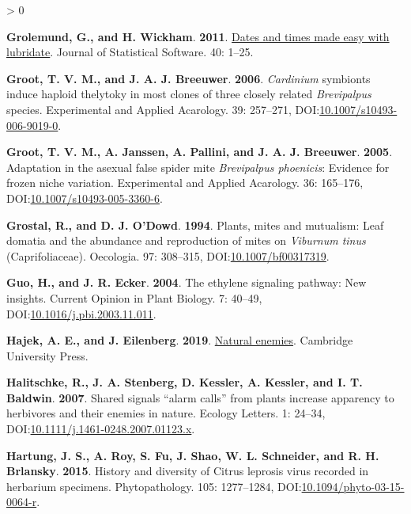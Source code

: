 \documentclass{ufdissertation}[overrideChapters] %
\newlength{\cslhangindent}
\newenvironment{CSLReferences}[2] %
 {%
  \setlength{\parindent}{0pt}
  \ifodd #1 \everypar{\setlength{\hangindent}{\cslhangindent}}\ignorespaces\fi
  \ifnum #2 > 0
  \setlength{\parskip}{#2\baselineskip}
  \fi
 }%
 {}
\begin{document}
{\begin{CSLReferences}{1}{1}
\leavevmode{}%
\textbf{Grolemund, G., and H. Wickham}. \textbf{2011}. \href{https://www.jstatsoft.org/v40/i03/}{Dates and times made easy with {lubridate}}. Journal of Statistical Software. 40: 1--25.

\leavevmode{}%
\textbf{Groot, T. V. M., and J. A. J. Breeuwer}. \textbf{2006}. \emph{Cardinium} symbionts induce haploid thelytoky in most clones of three closely related {\emph{Brevipalpus}} species. Experimental and Applied Acarology. 39: 257--271, DOI:\href{https://doi.org/10.1007/s10493-006-9019-0}{10.1007/s10493-006-9019-0}.

\leavevmode{}%
\textbf{Groot, T. V. M., A. Janssen, A. Pallini, and J. A. J. Breeuwer}. \textbf{2005}. Adaptation in the asexual false spider mite {\emph{Brevipalpus phoenicis}}: Evidence for frozen niche variation. Experimental and Applied Acarology. 36: 165--176, DOI:\href{https://doi.org/10.1007/s10493-005-3360-6}{10.1007/s10493-005-3360-6}.

\leavevmode{}%
\textbf{Grostal, R., and D. J. O'Dowd}. \textbf{1994}. Plants, mites and mutualism: Leaf domatia and the abundance and reproduction of mites on {\emph{Viburnum tinus}} ({Caprifoliaceae}). Oecologia. 97: 308--315, DOI:\href{https://doi.org/10.1007/bf00317319}{10.1007/bf00317319}.

\leavevmode{}%
\textbf{Guo, H., and J. R. Ecker}. \textbf{2004}. The ethylene signaling pathway: New insights. Current Opinion in Plant Biology. 7: 40--49, DOI:\href{https://doi.org/10.1016/j.pbi.2003.11.011}{10.1016/j.pbi.2003.11.011}.

\leavevmode{}%
\textbf{Hajek, A. E., and J. Eilenberg}. \textbf{2019}. \href{https://www.ebook.de/de/product/31183605/ann_e_hajek_joergen_eilenberg_natural_enemies.html}{Natural enemies}. Cambridge University Press.

\leavevmode{}%
\textbf{Halitschke, R., J. A. Stenberg, D. Kessler, A. Kessler, and I. T. Baldwin}. \textbf{2007}. Shared signals {\textendash}{``alarm calls''} from plants increase apparency to herbivores and their enemies in nature. Ecology Letters. 1: 24--34, DOI:\href{https://doi.org/10.1111/j.1461-0248.2007.01123.x}{10.1111/j.1461-0248.2007.01123.x}.

\leavevmode{}%
\textbf{Hartung, J. S., A. Roy, S. Fu, J. Shao, W. L. Schneider, and R. H. Brlansky}. \textbf{2015}. History and diversity of {Citrus leprosis virus} recorded in herbarium specimens. Phytopathology{\textregistered}. 105: 1277--1284, DOI:\href{https://doi.org/10.1094/phyto-03-15-0064-r}{10.1094/phyto-03-15-0064-r}.


\end{CSLReferences}}
\end{document}

